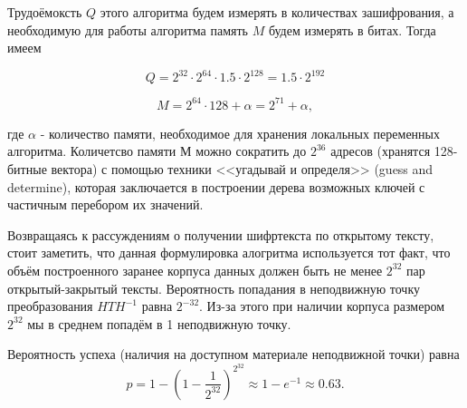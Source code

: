 \documentclass[a4paper,12pt]{article}
\theoremstyle{definition}
\begin{document}
	Трудоёмоксть $Q$ этого алгоритма будем измерять в количествах зашифрования, а необходимую для работы алгоритма память $M$ будем измерять в битах. Тогда имеем
	
	\[ Q = 2^{32} \cdot 2^{64} \cdot 1.5 \cdot 2^{128} = 1.5 \cdot 2^{192} \]
	
	\[ M = 2^{64} \cdot 128 + \alpha = 2^{71} + \alpha,  \]
	
	где $\alpha$ - количество памяти, необходимое для хранения локальных переменных алгоритма. Количетсво памяти $М$ можно сократить до $2^{36}$ адресов (хранятся 128-битные вектора) с помощью техники <<угадывай и определя>> (guess and determine), которая заключается в построении дерева возможных ключей с частичным перебором их значений.
	
	Возвращаясь к рассуждениям о получении шифртекста по открытому тексту, стоит заметить, что данная формулировка алогритма используется тот факт, что объём построенного заранее корпуса данных должен быть не менее $2^{32}$ пар открытый-закрытый тексты. Вероятность попадания в неподвижную точку преобразования $H T H^{-1}$ равна $2^{-32}$. Из-за этого при наличии корпуса размером $2^{32}$ мы в среднем попадём в 1 неподвижную точку.
	
	Вероятность успеха (наличия на доступном материале неподвижной точки) равна	\[ p=1-(1-\frac{1}{2^{32}})^{2^{32}} \approx 1 - e^{-1} \approx 0.63. \]
	
		
\end{document}
